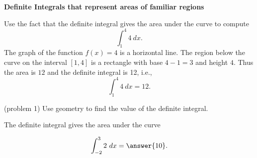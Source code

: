 \documentclass[handout]{ximera}
\begin{document}
\begin{center}
\textbf{Definite Integrals that represent areas of familiar regions}
\end{center}


\begin{example}[example 1]
Use the fact that the definite integral gives the area under the curve to compute
\[\int_{1}^4 4 \ dx.\]
The graph of the function $f(x) = 4$ is a horizontal line. The region below the curve on the interval $[1,4]$ is a rectangle with base $4-1=3$
and height $4$.  Thus the area is $12$ and the definite integral is 12, i.e.,
\[\int_1^4 4 \ dx =12.\]

\begin{image}
\end{image}

\end{example}


\begin{problem}(problem 1)
Use geometry to find the value of the definite integral.
\begin{hint}
The definite integral gives the area under the curve
\end{hint}
\[\int_{-2}^{3} 2 \ dx = \answer{10}.\]
\end{problem}
\end{document}
